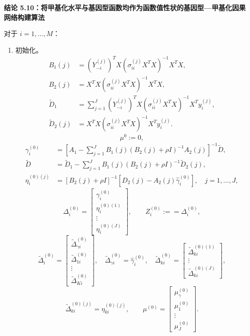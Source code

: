 \par\medskip{}
\noindent\textbf{结论 5.10：将甲基化水平与基因型函数均作为函数值性状的基因型—甲基化因果网络构建算法}\par
对于 $i=1,\ldots,M$：
\begin{enumerate}[label=步骤 \arabic*：,leftmargin=4.8em]
\item 初始化。
\[
\begin{aligned}
B_1(j)&=(Y_{-i}^{(j)})^TX(\sigma_{ii}^{(j)}X^TX)^{-1}X^TX,\\
B_2(j)&=X^TX(\sigma_{ii}^{(j)}X^TX)^{-1}X^TX,\\
\widetilde D_1&=\sum_{j=1}^J(Y_{-i}^{(j)})^TX(\sigma_{ii}^{(j)}X^TX)^{-1}X^Ty_i^{(j)},\\
\widetilde D_2(j)&=X^TX(\sigma_{ii}^{(j)}X^TX)^{-1}X^Ty_i^{(j)}.
\end{aligned}
\]
\[
\mu^0:=0,
\]
\[
\begin{aligned}
\gamma_i^{(0)}&=\left[A_1-\sum_{j=1}^JB_1(j)(B_2(j)+\rho I)^{-1}A_2(j)\right]^{-1}\widetilde D,\\
\widetilde D&=\widetilde D_1-\sum_{j=1}^JB_1(j)(B_2(j)+\rho I)^{-1}\widetilde D_2(j),\\
\eta_i^{(0)(j)}&=[B_2(j)+\rho I]^{-1}[D_2(j)-A_2(j)\widehat\gamma_i^{(0)}],\quad j=1,\ldots,J,
\end{aligned}
\]
\[
\Delta_i^{(0)}=\begin{bmatrix}\gamma_i^{(0)}\\\eta_i^{(0)(1)}\\\vdots\\\eta_i^{(0)(J)}\end{bmatrix},\qquad
Z_i^{(0)}:==\Delta_i^{(0)},
\]
\[
\widetilde\Delta_i^{(0)}=\begin{bmatrix}\widetilde\Delta_{\gamma i}^{(0)}\\\widetilde\Delta_{1i}^{(0)}\\\vdots\\\widetilde\Delta_{Ki}^{(0)}\end{bmatrix},\quad
\widetilde\Delta_{\gamma i}^{(0)}=\widehat\gamma_i^{(0)},\quad
\widetilde\Delta_{ki}^{(0)}=\begin{bmatrix}\widetilde\Delta_{ki}^{(0)(1)}\\\vdots\\\widetilde\Delta_{ki}^{(0)(J)}\end{bmatrix},
\]
\[
\widetilde\Delta_{ki}^{(0)(j)}=\eta_{ki}^{(0)(j)},\qquad
\mu^{(0)}=\begin{bmatrix}\mu_\gamma^{(0)}\\\mu_1^{(0)}\\\vdots\\\mu_J^{(0)}\end{bmatrix}.
\]
\end{enumerate}
